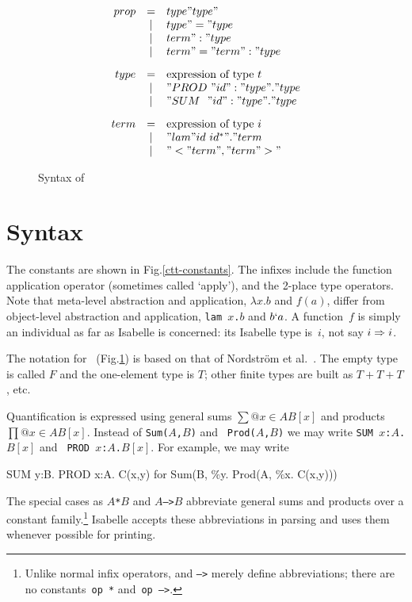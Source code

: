 \begin{figure}
\begin{center}
\dquotes
\[ \begin{array}{rcl}
prop    & = &  type " type"       \\
        & | & type " = " type     \\
        & | & term " : " type        \\
        & | & term " = " term " : " type 
\\[2ex]
type    & = & \hbox{expression of type~$t$} \\
        & | & "PROD~" id " : " type " . " type  \\
        & | & "SUM~~" id " : " type " . " type 
\\[2ex]
term    & = & \hbox{expression of type~$i$} \\
        & | & "lam " id~id^* " . " term   \\
        & | & "< " term " , " term " >"
\end{array} 
\]
\end{center}
\caption{Syntax of {\CTT}} \label{ctt-syntax}
\end{figure}



\section{Syntax}
The constants are shown in Fig.\ts\ref{ctt-constants}.  The infixes include
the function application operator (sometimes called `apply'), and the
2-place type operators.  Note that meta-level abstraction and application,
$\lambda x.b$ and $f(a)$, differ from object-level abstraction and
application, \hbox{\tt lam $x$.$b$} and $b{\tt`}a$.  A {\CTT}
function~$f$ is simply an individual as far as Isabelle is concerned: its
Isabelle type is~$i$, not say $i\Rightarrow i$.

The notation for~{\CTT} (Fig.\ts\ref{ctt-syntax}) is based on that of
Nordstr\"om et al.~\cite{nordstrom90}.  The empty type is called $F$ and
the one-element type is $T$; other finite types are built as $T+T+T$, etc.

Quantification is expressed using general sums $\sum@{x\in A}B[x]$ and
products $\prod@{x\in A}B[x]$.  Instead of {\tt Sum($A$,$B$)} and {\tt
  Prod($A$,$B$)} we may write \hbox{\tt SUM $x$:$A$.$B[x]$} and \hbox{\tt
  PROD $x$:$A$.$B[x]$}.  For example, we may write
\begin{ttbox}
SUM y:B. PROD x:A. C(x,y)   {\rm for}   Sum(B, \%y. Prod(A, \%x. C(x,y)))
\end{ttbox}
The special cases as \hbox{\tt$A$*$B$} and \hbox{\tt$A$-->$B$} abbreviate
general sums and products over a constant family.\footnote{Unlike normal
infix operators, {\tt*} and {\tt-->} merely define abbreviations; there are
no constants~{\tt op~*} and~\hbox{\tt op~-->}.}  Isabelle accepts these
abbreviations in parsing and uses them whenever possible for printing.



